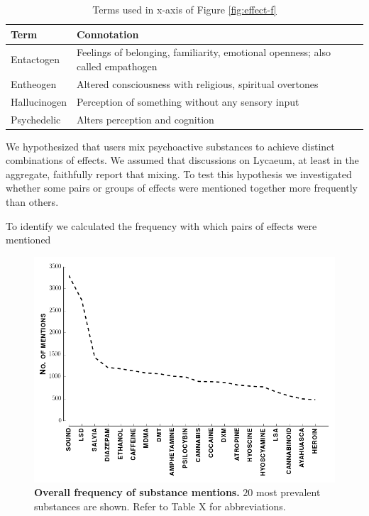 \documentclass{article}
\begin{document}
\begin{table}[h]
\centering
\begin{tabular}{@{}ll@{}}
\toprule
Term         & Connotation                                                                    \\ \midrule
Entactogen   & Feelings of belonging, familiarity, emotional openness; also called empathogen \\
Entheogen    & Altered consciousness with religious, spiritual overtones                      \\
Hallucinogen & Perception of something without any sensory input                              \\
Psychedelic  & Alters perception and cognition                                                \\ \bottomrule
\end{tabular}
\caption{Terms used in x-axis of Figure \ref{fig:effect-f}}
\label{tab:effect-defs}
\end{table}

   We hypothesized that users mix psychoactive substances to achieve distinct combinations of effects. We assumed that discussions on Lycaeum, at least in the aggregate, faithfully report that mixing. To test this hypothesis we investigated whether some pairs or groups of effects were mentioned together more frequently than others.
   
     To identify  we calculated the frequency with which pairs of effects were mentioned 
   
   
\begin{figure}[h]
\centering
\includegraphics[scale=0.65]{overall-drug-frequency.png}
\caption{\textbf{Overall frequency of substance mentions.} $20$ most prevalent substances are shown. Refer to Table X for abbreviations.}
\label{fig:overall-f}
\end{figure}
\end{document}
